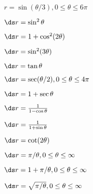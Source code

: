 \begin{exercises}
\exercise $r=\sin(\theta/3), 0\le\theta\le6\pi$

\exercise $\ds r=\sin^2\theta$

\exercise $\ds r=1+\cos^2(2\theta)$

\exercise $\ds r=\sin^2(3\theta)$

\exercise $\ds r=\tan\theta$

\exercise $\ds r=\sec(\theta/2), 0\le\theta\le4\pi$

\exercise $\ds r=1+\sec\theta$

\exercise $\ds r={1\over 1-\cos\theta}$

\exercise $\ds r={1\over 1+\sin\theta}$

\exercise $\ds r=\cot(2\theta)$

\exercise $\ds r=\pi/\theta, 0\le\theta\le\infty$

\exercise $\ds r=1+\pi/\theta, 0\le\theta\le\infty$

\exercise $\ds r=\sqrt{\pi/\theta}, 0\le\theta\le\infty$

\endtwocol

\end{exercises}

